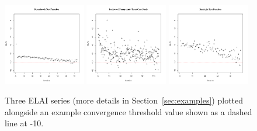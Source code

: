 \documentclass[12pt]{article}
\begin{document}
\clearpage
%
%
\begin{figure}
\includegraphics[width=0.32\textwidth]{./figures/introChartRoseEasyEasyAxis.pdf}
\includegraphics[width=0.32\textwidth]{./figures/introChartLock6Three20000Axis.pdf}
\includegraphics[width=0.32\textwidth]{./figures/introChartRastHardAxis.pdf}
\caption{
%
Three ELAI series (more details in Section~\ref{sec:examples}) plotted alongside an example convergence threshold value shown as a dashed line at -10.
}
\label{introFig}
\end{figure}
%
%
\end{document}
